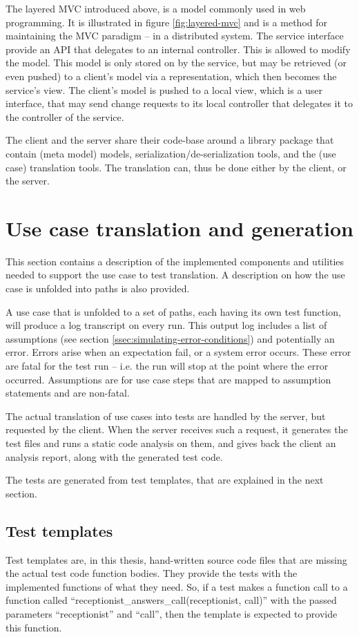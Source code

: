 \noindent The layered MVC introduced above, is a model commonly used in web programming. It is illustrated in figure \ref{fig:layered-mvc} and is a method for maintaining the MVC paradigm -- in a distributed system. The service interface provide an API that delegates to an internal controller. This is allowed to modify the model. This model is only stored on by the service, but may be retrieved (or even pushed) to a client's model via a representation, which then becomes the service's view. The client's model is pushed to a local view, which is a user interface, that may send change requests to its local controller that delegates it to the controller of the service.\medskip

\noindent The client and the server share their code-base around a library package that contain (meta model) models, serialization/de-serialization tools, and the (use case) translation tools. The translation can, thus be done either by the client, or the server.

\section{Use case translation and generation}
This section contains a description of the implemented components and utilities needed to support the use case to test translation. A description on how the use case is unfolded into paths is also provided.\medskip

\noindent A use case that is unfolded to a set of paths, each having its own test function, will produce a log transcript on every run. This output log includes a list of assumptions (see section \ref{ssec:simulating-error-conditions}) and potentially an error. Errors arise when an expectation fail, or a system error occurs. These error are fatal for the test run -- i.e. the run will stop at the point where the error occurred. Assumptions are for use case steps that are mapped to assumption statements and are non-fatal.\medskip

\noindent The actual translation of use cases into tests are handled by the server, but requested by the client. When the server receives such a request, it generates the test files and runs a static code analysis on them, and gives back the client an analysis report, along with the generated test code.\medskip

\noindent
The tests are generated from test templates, that are explained in the next section.

\subsection{Test templates}
Test templates are, in this thesis, hand-written source code files that are missing the actual test code function bodies. They provide the tests with the implemented functions of what they need. So, if a test makes a function call to a function called ``receptionist\_answers\_call(receptionist, call)'' with the passed parameters ``receptionist'' and ``call'', then the template is expected to provide this function.\medskip

